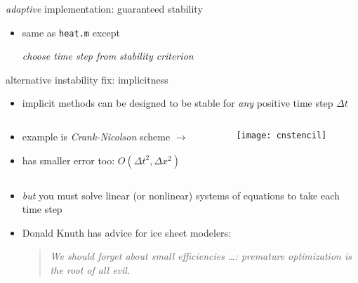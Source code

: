 \begin{frame}{\textsl{adaptive} implementation: guaranteed stability}


\begin{itemize}
\item same as \texttt{heat.m} except

\begin{center}
\emph{choose time step from stability criterion}
\end{center}
\end{itemize}\end{frame}


\begin{frame}{alternative instability fix: implicitness}

\begin{itemize}
\item \alert{implicit} methods can be designed to be stable for \emph{any} positive time step $\Delta t$
\end{itemize}

\begin{columns}
\begin{column}{0.7\textwidth}
\small
\begin{itemize}
\item example is \emph{Crank-Nicolson} scheme $\longrightarrow$
\item has smaller error too: $O(\Delta t^2,\Delta x^2)$
\end{itemize}
\normalsize
\end{column}
\begin{column}{0.3\textwidth}
\texttt{[image: cnstencil]}
\end{column}
\end{columns}

\bigskip
\begin{itemize}
\item \emph{but} you must solve linear (or nonlinear) systems of equations to take each time step
\medskip

\item \scriptsize Donald Knuth has advice for ice sheet modelers: \begin{quote}
\emph{We should forget about small efficiencies \dots: premature optimization is the root of all evil}.
\end{quote}
\end{itemize}
\end{frame}


